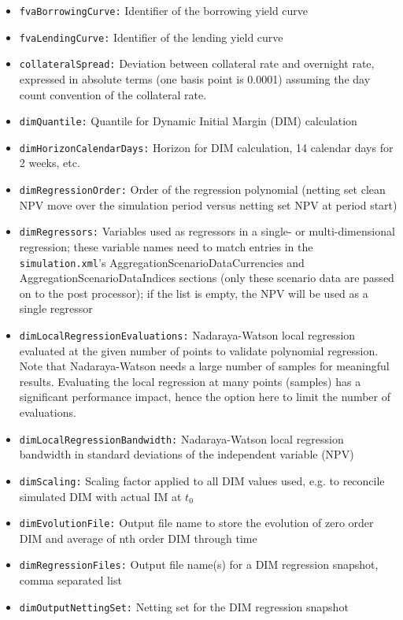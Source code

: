 \documentclass[12pt, a4paper]{article}
\begin{document}
\begin{itemize}
\item {\tt fvaBorrowingCurve:} Identifier of the borrowing yield curve
\item {\tt fvaLendingCurve:} Identifier of the lending yield curve
\item {\tt collateralSpread:} Deviation between collateral rate and overnight rate, expressed in absolute terms (one
basis point is 0.0001) assuming the day count convention of the collateral rate. 
\item {\tt dimQuantile:} Quantile for Dynamic Initial Margin (DIM) calculation
\item {\tt dimHorizonCalendarDays:} Horizon for DIM calculation, 14 calendar days for 2 weeks, etc.
\item {\tt dimRegressionOrder:} Order of the regression polynomial (netting set clean NPV move over the simulation
period versus netting set NPV at period start)
\item {\tt dimRegressors:} Variables used as regressors in a single- or multi-dimensional regression; these variable
  names need to match entries in the {\tt simulation.xml}'s AggregationScenarioDataCurrencies and
  AggregationScenarioDataIndices sections (only these scenario data are passed on to the post processor); if the list is
  empty, the NPV will be used as a single regressor
\item {\tt dimLocalRegressionEvaluations:} Nadaraya-Watson local regression evaluated at the given number of points to
validate polynomial regression. Note that Nadaraya-Watson needs a large number of samples for meaningful
results. Evaluating the local regression at many points (samples) has a significant performance impact, hence the option
here to limit the number of evaluations.
\item {\tt dimLocalRegressionBandwidth:} Nadaraya-Watson local regression bandwidth in standard deviations of the
independent variable (NPV)
\item {\tt dimScaling:} Scaling factor applied to all DIM values used, e.g. to reconcile simulated DIM with actual IM at
$t_0$
\item {\tt dimEvolutionFile:} Output file name to store the evolution of zero order DIM and average of nth order DIM
through time
\item {\tt dimRegressionFiles:} Output file name(s) for a DIM regression snapshot, comma separated list
\item {\tt dimOutputNettingSet:} Netting set for the DIM regression snapshot

\end{itemize}
\end{document}
